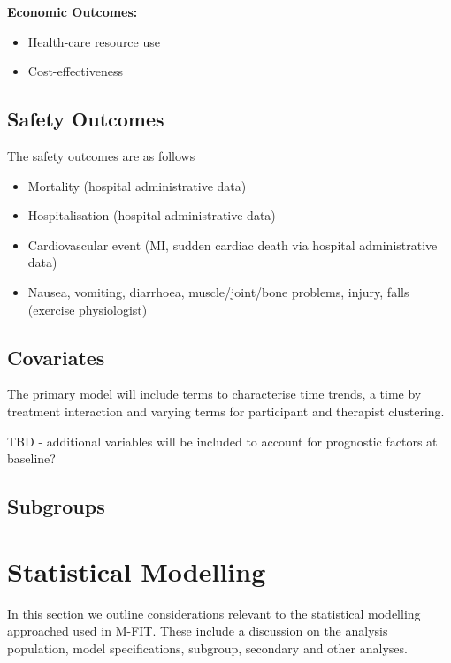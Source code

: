 \documentclass[
]{article}
\begin{document}
\textbf{Economic Outcomes:}
\begin{itemize}
  \item Health-care resource use
  \item Cost-effectiveness
\end{itemize}

\hypertarget{safety-outcomes}{%
  \subsection{Safety Outcomes}\label{safety-outcomes}}

The safety outcomes are as follows

\begin{itemize}
  \item Mortality (hospital administrative data)
  \item Hospitalisation (hospital administrative data)
  \item Cardiovascular event (MI, sudden cardiac death via hospital administrative data)
  \item Nausea, vomiting, diarrhoea, muscle/joint/bone problems, injury, falls (exercise physiologist)
\end{itemize}

\hypertarget{covariates}{%
  \subsection{Covariates}\label{covariates}}

The primary model will include terms to characterise time trends, a time by treatment interaction and varying terms for participant and therapist clustering.

TBD - additional variables will be included to account for prognostic factors at baseline?

\hypertarget{subgroups}{%
  \subsection{Subgroups}\label{subgroups}}

\clearpage

\hypertarget{statistical-modelling}{%
  \section{Statistical Modelling}\label{statistical-modelling}}

In this section we outline considerations relevant to the statistical modelling approached used in M-FIT.
These include a discussion on the analysis population, model specifications, subgroup, secondary and other analyses.
\end{document}
